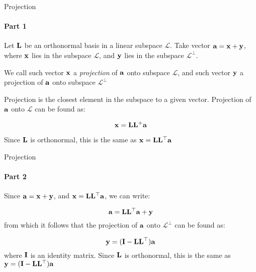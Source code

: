 \documentclass{beamer}
\begin{document}
\begin{frame}{Projection}
	\framesubtitle{Part 1}
	\begin{flushleft}
		
		Let $\mathbf{L}$ be an orthonormal basis in a linear subspace $\mathcal{L}$. Take vector $\mathbf{a} = \mathbf{x} + \mathbf{y}$, where $\mathbf{x}$ lies in the subspace $\mathcal{L}$, and $\mathbf{y}$ lies in the subspace $\mathcal{L}^\perp$.
		
		\bigskip
		
		\begin{definition}
			We call such vector $\mathbf{x}$ a \emph{projection} of $\mathbf{a}$ onto subspace $\mathcal{L}$, and such vector $\mathbf{y}$ a projection of $\mathbf{a}$ onto subspace $\mathcal{L}^\perp$
		\end{definition}
		
		\bigskip
		
		Projection is the closest element in the subspace to a given vector. Projection of $\mathbf{a}$ onto $\mathcal{L}$ can be found as: 
		
		\begin{equation}
			\mathbf{x} = \mathbf{L} \mathbf{L}^+ \mathbf{a}
		\end{equation}
		
		Since $\mathbf{L}$ is orthonormal, this is the same as $\mathbf{x} = \mathbf{L} \mathbf{L}^\top \mathbf{a}$
		
	\end{flushleft}
\end{frame}



\begin{frame}{Projection}
	\framesubtitle{Part 2}
	\begin{flushleft}
		
		Since $\mathbf{a} = \mathbf{x} + \mathbf{y}$, and $\mathbf{x} = \mathbf{L} \mathbf{L}^\top \mathbf{a}$, we can write:
		
		\begin{equation}
			\mathbf{a} = \mathbf{L} \mathbf{L}^\top \mathbf{a} + \mathbf{y}
		\end{equation}
		from which it follows that the projection of $\mathbf{a}$ onto $\mathcal{L}^\perp$ can be found as: 
		
		\begin{equation}
			\mathbf{y} = (\mathbf{I} - \mathbf{L} \mathbf{L}^\top) \mathbf{a}
		\end{equation}
		where $\mathbf{I}$ is an identity matrix. Since $\mathbf{L}$ is orthonormal, this is the same as $\mathbf{y} = (\mathbf{I} - \mathbf{L} \mathbf{L}^\top) \mathbf{a}$
		
	\end{flushleft}
\end{frame}
\end{document}
